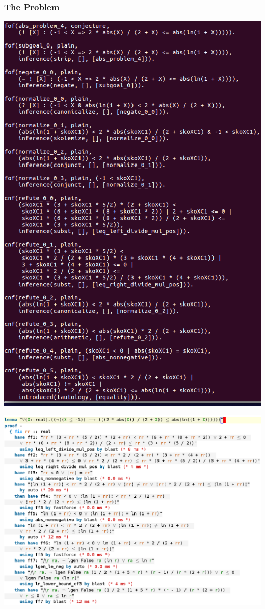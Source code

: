 \documentclass{beamer}
\begin{document}
\begin{frame}
\frametitle{The Problem}

\begin{minipage}{0.3\linewidth}
\includegraphics[scale=0.2]{MT_proof}
\end{minipage}
\hfill
\begin{minipage}{0.57\linewidth}
\includegraphics[scale=0.18]{isabelle_proof}
\end{minipage}


\end{frame}
\end{document}

